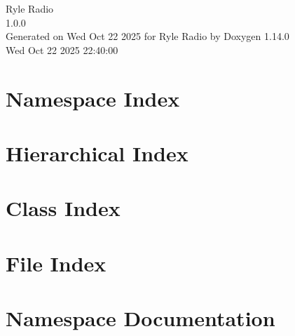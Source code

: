 \documentclass[twoside]{book}
\newcommand{\+}{\discretionary{\mbox{\scriptsize$\hookleftarrow$}}{}{}}
\newcommand{\clearemptydoublepage}{%
    \newpage{\pagestyle{empty}\cleardoublepage}%
  }
\begin{document}
  \raggedbottom
    \hypersetup{pageanchor=false,
                bookmarksnumbered=true,
                pdfencoding=unicode
               }
  \begin{titlepage}
  \vspace*{7cm}
  \begin{center}%
  {\Large Ryle Radio}\\
  [1ex]\large 1.\+0.\+0 \\
  \vspace*{1cm}
  {\large Generated on Wed Oct 22 2025 for Ryle Radio by Doxygen 1.14.0}\\
    \vspace*{0.5cm}
    {\small Wed Oct 22 2025 22:40:00}
  \end{center}
  \end{titlepage}
  \clearemptydoublepage
  \tableofcontents
  \clearemptydoublepage
  \hypersetup{pageanchor=true}
\chapter{Namespace Index}

\chapter{Hierarchical Index}

\chapter{Class Index}

\chapter{File Index}

\chapter{Namespace Documentation}





\end{document}
